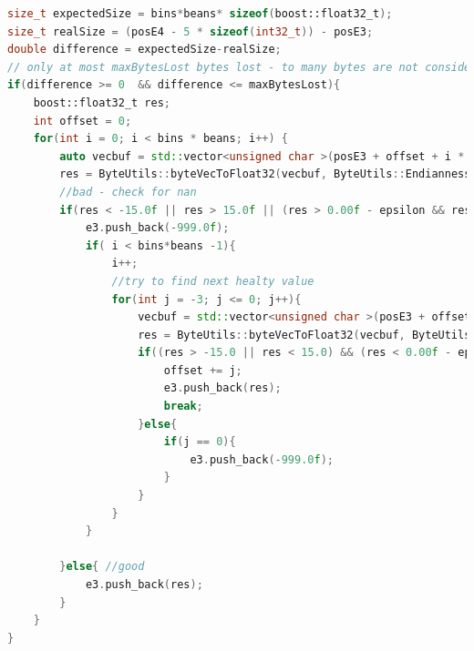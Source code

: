 \begin{lstlisting}[language=C++, caption=Code snippet from the repair function - it finds missing bytes.]
size_t expectedSize = bins*beans* sizeof(boost::float32_t);
size_t realSize = (posE4 - 5 * sizeof(int32_t)) - posE3;
double difference = expectedSize-realSize;
// only at most maxBytesLost bytes lost - to many bytes are not considered
if(difference >= 0  && difference <= maxBytesLost){
    boost::float32_t res;
    int offset = 0;
    for(int i = 0; i < bins * beans; i++) {
        auto vecbuf = std::vector<unsigned char >(posE3 + offset + i * 4, posE3 + offset + i * 4 + 4);
        res = ByteUtils::byteVecToFloat32(vecbuf, ByteUtils::Endianness::LittleEndian);
        //bad - check for nan
        if(res < -15.0f || res > 15.0f || (res > 0.00f - epsilon && res < 0.00f + epsilon) || res != res) {
            e3.push_back(-999.0f);
            if( i < bins*beans -1){
                i++;
                //try to find next healty value
                for(int j = -3; j <= 0; j++){
                    vecbuf = std::vector<unsigned char >(posE3 + offset + j + i * 4, posE3 + offset + j + i * 4 + 4);
                    res = ByteUtils::byteVecToFloat32(vecbuf, ByteUtils::Endianness::LittleEndian);
                    if((res > -15.0 || res < 15.0) && (res < 0.00f - epsilon || res > 0.00f + epsilon)){
                        offset += j;
                        e3.push_back(res);
                        break;
                    }else{
                        if(j == 0){
                            e3.push_back(-999.0f);
                        }
                    }
                }
            }

        }else{ //good
            e3.push_back(res);
        }
    }
}
\end{lstlisting}

\pagebreak


